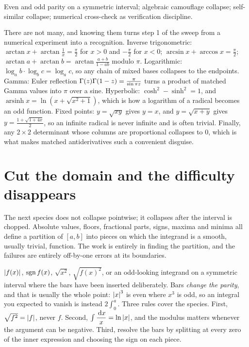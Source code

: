 \begin{seealsob}Even and odd parity on a symmetric interval; algebraic camouflage collapse; self-similar collapse; numerical cross-check as verification discipline.\end{seealsob}

\begin{keynote}
There are not many, and knowing them turns step 1 of the sweep from a numerical experiment into a recognition. Inverse trigonometric: $\arctan x+\arctan\tfrac1x=\tfrac{\pi}{2}$ for $x>0$ and $-\tfrac{\pi}{2}$ for $x<0$; $\arcsin x+\arccos x=\tfrac{\pi}{2}$; $\arctan a+\arctan b=\arctan\tfrac{a+b}{1-ab}$ modulo $\pi$. Logarithmic: $\log_ab\cdot\log_bc=\log_ac$, so any chain of mixed bases collapses to the endpoints. Gamma: Euler reflection $\Gamma(z)\Gamma(1-z)=\tfrac{\pi}{\sin\pi z}$ turns a product of matched Gamma values into $\pi$ over a sine. Hyperbolic: $\cosh^{2}-\sinh^{2}=1$, and $\operatorname{arsinh}x=\ln(x+\sqrt{x^{2}+1})$, which is how a logarithm of a radical becomes an odd function. Fixed points: $y=\sqrt{xy}$ gives $y=x$, and $y=\sqrt{x+y}$ gives $y=\tfrac{1+\sqrt{1+4x}}{2}$, so an infinite radical is never infinite and is often trivial. Finally, any $2\times2$ determinant whose columns are proportional collapses to $0$, which is what makes matched antiderivatives such a convenient disguise.
\end{keynote}

\section{Cut the domain and the difficulty disappears}

The next species does not collapse pointwise; it collapses after the interval is chopped. Absolute values, floors, fractional parts, signs, maxima and minima all define a partition of $[a,b]$ into pieces on which the integrand is a smooth, usually trivial, function. The work is entirely in finding the partition, and the failures are entirely off-by-one errors at its boundaries.

\cue $\left\lvert f(x)\right\rvert$, $\operatorname{sgn} f(x)$, $\sqrt{x^{2}}$, $\sqrt{f(x)^{2}}$, or an odd-looking integrand on a symmetric interval where the bars have been inserted deliberately.
\method Bars \emph{change the parity}, and that is usually the whole point: $\left\lvert x\right\rvert^{3}$ is even where $x^{3}$ is odd, so an integral you expected to vanish is instead $2\int_0^{a}$. Three rules cover the species. First, $\sqrt{f^{2}}=\left\lvert f\right\rvert$, never $f$. Second, $\int\dfrac{\,\mathrm{d} x}{x}=\ln\left\lvert x\right\rvert$, and the modulus matters whenever the argument can be negative. Third, resolve the bars by splitting at every zero of the inner expression and choosing the sign on each piece.

